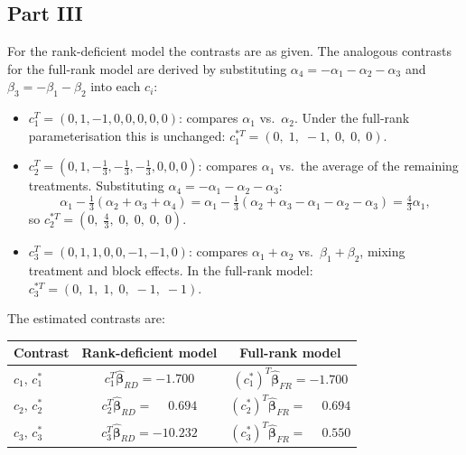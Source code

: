 \documentclass[letterpaper]{article}
\begin{document}
			\clearpage
			\subsection{Part III}
				
				For the rank-deficient model the contrasts are as given. The analogous
				contrasts for the full-rank model are derived by substituting
				$\alpha_4 = -\alpha_1-\alpha_2-\alpha_3$ and
				$\beta_3 = -\beta_1-\beta_2$ into each $c_i$:
				
				\begin{itemize}
					\item $c_1^T = (0,1,-1,0,0,0,0,0)$: compares $\alpha_1$ vs.\ $\alpha_2$.
					Under the full-rank parameterisation this is unchanged:
					$c_1^{*T} = (0,\;1,\;-1,\;0,\;0,\;0)$.
					
					\item $c_2^T = (0,1,-\tfrac{1}{3},-\tfrac{1}{3},-\tfrac{1}{3},0,0,0)$:
					compares $\alpha_1$ vs.\ the average of the remaining treatments.
					Substituting $\alpha_4 = -\alpha_1-\alpha_2-\alpha_3$:
					\[
					\alpha_1 - \tfrac{1}{3}(\alpha_2+\alpha_3+\alpha_4)
					= \alpha_1 - \tfrac{1}{3}(\alpha_2+\alpha_3-\alpha_1-\alpha_2-\alpha_3)
					= \tfrac{4}{3}\alpha_1,
					\]
					so $c_2^{*T} = (0,\;\tfrac{4}{3},\;0,\;0,\;0,\;0)$.
					
					\item $c_3^T = (0,1,1,0,0,-1,-1,0)$: compares $\alpha_1+\alpha_2$
					vs.\ $\beta_1+\beta_2$, mixing treatment and block effects.
					In the full-rank model:
					$c_3^{*T} = (0,\;1,\;1,\;0,\;-1,\;-1)$.
				\end{itemize}
				
				The estimated contrasts are:
				
				\begin{center}
					\begin{tabular}{lcc}
						\hline
						Contrast & Rank-deficient model & Full-rank model \\
						\hline
						$c_1,\,c_1^*$ & $c_1^T\hat{\boldsymbol{\beta}}_{RD} = -1.700$ &
						$(c_1^*)^T\hat{\boldsymbol{\beta}}_{FR} = -1.700$ \\
						$c_2,\,c_2^*$ & $c_2^T\hat{\boldsymbol{\beta}}_{RD} = \phantom{-}0.694$ &
						$(c_2^*)^T\hat{\boldsymbol{\beta}}_{FR} = \phantom{-}0.694$ \\
						$c_3,\,c_3^*$ & $c_3^T\hat{\boldsymbol{\beta}}_{RD} = -10.232$ &
						$(c_3^*)^T\hat{\boldsymbol{\beta}}_{FR} = \phantom{-}0.550$ \\
						\hline
					\end{tabular}
				\end{center}
				
\end{document}
